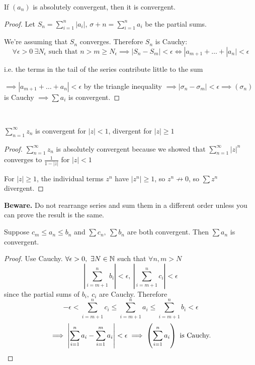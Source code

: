 \begin{theorem}
	If $(a_n)$ is absolutely convergent, then it is convergent.
\end{theorem}

\begin{proof}
Let $S_n = \sum_{i=1}^{n} |a_i|$, $\sigma+n = \sum_{i=1}^n a_i$ be the partial sums.

We're assuming that $S_n$ converges. Therefore $S_n$ is Cauchy: \[ \forall \epsilon >0~ \exists N_{\epsilon}\text{ such that }n > m \geq N_{\epsilon} \implies |S_n - S_m| < \epsilon \iff |a_{m+1} + \dots + |a_n| < \epsilon\]

i.e. the terms in the tail of the series contribute little to the sum 

$\implies |a_{m+1} + \dots + a_n| < \epsilon$ by the triangle inequality $\implies |\sigma_n - \sigma_m| < \epsilon \implies (\sigma_n)$ is Cauchy $\implies \sum a_i$ is convergent.
\end{proof}~

\begin{example}
$\sum_{n=1}^{\infty} z_n$ is convergent for $|z| < 1$, divergent for $|z| \geq 1$
\begin{proof}
$\sum_{n=1}^{\infty} z_n$ is absolutely convergent because we showed that $\sum_{n=1}^{\infty} |z|^n$ converges to $\frac{1}{1 - |z|}$ for $|z| < 1$	

For $|z| \geq 1$, the individual terms $z^n$ have $|z^n| \geq 1$, so $z^n \not\to 0$, so $\sum z^n$ divergent.
\end{proof}
\end{example}

\textbf{Beware.} Do not rearrange series and sum them in a different order unless you can prove the result is the same.\\


\begin{theorem}
	Suppose $c_m \leq a_n \leq b_n$ and $\sum c_n,~\sum b_n$ are both convergent. Then $\sum a_n$ is convergent.
\end{theorem}
\begin{proof}
Use Cauchy. $\forall \epsilon >0,~ \exists N \in \mathbb{N}$ such that $\forall n,m > N$
\[\left|\sum_{i=m+1}^n b_i\right| < \epsilon,~\left|\sum_{i=m+1}^n c_i\right| < \epsilon\] since the partial sums of $b_i,~c_i$ are Cauchy. Therefore
\[-\epsilon <\sum_{i=m+1}^n c_i \leq \sum_{i=m+1}^n a_i \leq \sum_{i=m+1}^n b_i < \epsilon   \]
\[\implies \left|\sum_{i=1}^{n} a_i - \sum_{i=1}^m a_i\right| < \epsilon \implies \left(\sum_{i=1}^{n} a_i \right) \text{ is Cauchy.} \qedhere\]
\end{proof}\vspace*{10pt}


